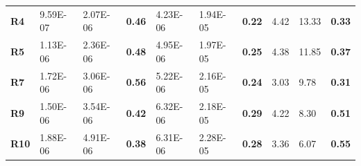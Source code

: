 \documentclass[encoding=utf8,british]{tumphthesis}
\begin{document}
\begin{table}[H]
\begin{subtable}{1\textwidth}
{\begin{tabular}{|l|llr|llr|llr|}
\textbf{R4}                               & 9.59E-07                                             & 2.07E-06                                              & \textbf{0.46}                                    & 4.23E-06                                             & 1.94E-05                                              & \textbf{0.22}                                    & 4.42                                                 & 13.33                                                 & \textbf{0.33}                                    \\
\rowcolor[HTML]{CFE2F3} 
\textbf{R5}                               & 1.13E-06                                             & 2.36E-06                                              & \textbf{0.48}                                    & 4.95E-06                                           & 1.97E-05                                              & \textbf{0.25}                                    & 4.38                                                 & 11.85                                                 & \textbf{0.37}                                    \\
\textbf{R7}                               & 1.72E-06                                             & 3.06E-06                                              & \textbf{0.56}                                    & 5.22E-06                                             & 2.16E-05                                              & \textbf{0.24}                                    & 3.03                                                 & 9.78                                                  & \textbf{0.31}                                    \\
\rowcolor[HTML]{CFE2F3} 
\textbf{R9}                               & 1.50E-06                                             & 3.54E-06                                              & \textbf{0.42}                                    & 6.32E-06                                             & 2.18E-05                                              & \textbf{0.29}                                    & 4.22                                                 & 8.30                                                  & \textbf{0.51}                                    \\
\textbf{R10}                              & 1.88E-06                                             & 4.91E-06                                              & \textbf{0.38}                                    & 6.31E-06                                             & 2.28E-05                                              & \textbf{0.28}                                    & 3.36                                                 & 6.07                                                  & \textbf{0.55}                                    \\

\end{tabular}}
\end{subtable}
\end{table}
\end{document}
